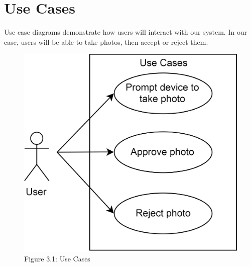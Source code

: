 \chapter{Use Cases}
Use case diagrams demonstrate how users will interact with our system. In our case, users will be able to take photos, then accept or reject them. 

\begin{figure}[!h]
    \centering
    \includegraphics[scale=0.25]{usecasediagram}
    \caption{Figure 3.1: Use Cases}
    \label{fig:usecasediagram}
\end{figure}

\pagebreak

